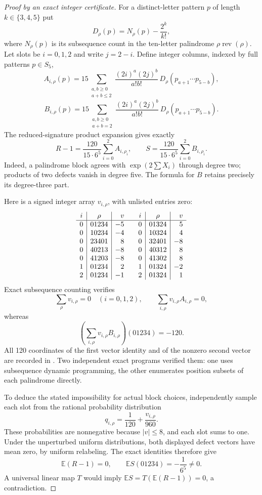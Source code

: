 \documentclass[11pt]{article}
\begin{document}
\begin{proof}[Proof by an exact integer certificate]
For a distinct-letter pattern $p$ of length $k\in\{3,4,5\}$ put
\[
 D_\rho(p)=N_\rho(p)-\frac{2^k}{k!},
\]
where $N_\rho(p)$ is its subsequence count in the ten-letter palindrome
$\rho\operatorname{rev}(\rho)$. Let slots be $i=0,1,2$ and write
$j=2-i$. Define integer columns, indexed by full patterns $p\in S_5$,
\[
 A_{i,\rho}(p)=15\sum_{\substack{a,b\ge0\\a+b\le2}}
 \frac{(2i)^a(2j)^b}{a!b!}\,
 D_\rho(p_{a+1}\cdots p_{5-b}),
\]
\[
 B_{i,\rho}(p)=15\sum_{\substack{a,b\ge0\\a+b=2}}
 \frac{(2i)^a(2j)^b}{a!b!}\,
 D_\rho(p_{a+1}\cdots p_{5-b}).
\]
The reduced-signature product expansion gives exactly
\[
 R-1=\frac{120}{15\cdot6^5}\sum_{i=0}^2 A_{i,\rho_i},\qquad
 S=\frac{120}{15\cdot6^5}\sum_{i=0}^2 B_{i,\rho_i}.
\]
Indeed, a palindrome block agrees with $\exp(2\sum X_i)$ through
degree two; products of two defects vanish in degree five. The formula
for $B$ retains precisely its degree-three part.

Here is a signed integer array $v_{i,\rho}$, with unlisted entries zero:
\[
\begin{array}{c|c|r@{\qquad}c|c|r}
 i&\rho&v&i&\rho&v\\\hline
 0&01234&-5&0&01324&5\\
 0&10234&-4&0&10324&4\\
 0&23401&8&0&32401&-8\\
 0&40213&-8&0&40312&8\\
 0&41203&-8&0&41302&8\\
 1&01234&2&1&01324&-2\\
 2&01234&-1&2&01324&1
\end{array}
\]
Exact subsequence counting verifies
\[
 \sum_\rho v_{i,\rho}=0\quad(i=0,1,2),\qquad
 \sum_{i,\rho}v_{i,\rho}A_{i,\rho}=0,
\]
whereas
\[
 \left(\sum_{i,\rho}v_{i,\rho}B_{i,\rho}\right)(01234)=-120.
\]
All 120 coordinates of the first vector identity and of the nonzero
second vector are recorded in
. Two independent exact
programs verified them: one uses subsequence dynamic programming, the
other enumerates position subsets of each palindrome directly.

To deduce the stated impossibility for actual block choices, independently
sample each slot from the rational probability distribution
\[
 q_{i,\rho}=\frac1{120}+\frac{v_{i,\rho}}{960}.
\]
These probabilities are nonnegative because $|v|\le8$, and each slot
sums to one. Under the unperturbed uniform distributions, both displayed
defect vectors have mean zero, by uniform relabeling. The exact identities
therefore give
\[
 \mathbb E(R-1)=0,\qquad
 \mathbb E S(01234)=-\frac1{6^5}\ne0.
\]
A universal linear map $T$ would imply
$\mathbb ES=T(\mathbb E(R-1))=0$, a contradiction.
\end{proof}
\end{document}
